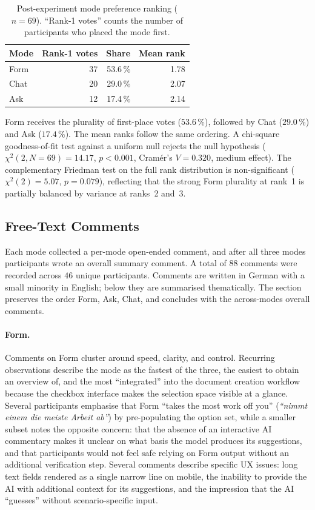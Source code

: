 \begin{table}[htbp]
\centering
\caption{Post-experiment mode preference ranking ($n = 69$). ``Rank-1 votes''
counts the number of participants who placed the mode first.}
\label{tab:mode-preference}
\begin{tabular}{@{}l r r r@{}}
\toprule
Mode & Rank-1 votes & Share & Mean rank \\
\midrule
Form & 37 & 53.6\,\% & 1.78 \\
Chat & 20 & 29.0\,\% & 2.07 \\
Ask  & 12 & 17.4\,\% & 2.14 \\
\bottomrule
\end{tabular}
\end{table}

Form receives the plurality of first-place votes ($53.6\,\%$), followed by
Chat ($29.0\,\%$) and Ask ($17.4\,\%$). The mean ranks follow the same
ordering. A chi-square goodness-of-fit test against a uniform null rejects
the null hypothesis ($\chi^2(2, N = 69) = 14.17$, $p < 0.001$, Cramér's
$V = 0.320$, medium effect). The complementary Friedman test on the full
rank distribution is non-significant ($\chi^2(2) = 5.07$, $p = 0.079$),
reflecting that the strong Form plurality at rank~1 is partially balanced by
variance at ranks~2 and~3.

\subsection{Free-Text Comments}

Each mode collected a per-mode open-ended comment, and after all three modes
participants wrote an overall summary comment. A total of $88$ comments were
recorded across $46$ unique participants. Comments are written in German with
a small minority in English; below they are summarised thematically. The
section preserves the order Form, Ask, Chat, and concludes with the
across-modes overall comments.

\paragraph{Form.} Comments on Form cluster around speed, clarity, and
control. Recurring observations describe the mode as the fastest of the
three, the easiest to obtain an overview of, and the most ``integrated''
into the document creation workflow because the checkbox interface makes the
selection space visible at a glance. Several participants emphasise that
Form ``takes the most work off you'' (\emph{``nimmt einem die meiste Arbeit
ab''}) by pre-populating the option set, while a smaller subset notes the
opposite concern: that the absence of an interactive AI commentary makes it
unclear on what basis the model produces its suggestions, and that
participants would not feel safe relying on Form output without an additional
verification step. Several comments describe specific UX issues: long text
fields rendered as a single narrow line on mobile, the inability to provide
the AI with additional context for its suggestions, and the impression that
the AI ``guesses'' without scenario-specific input.

